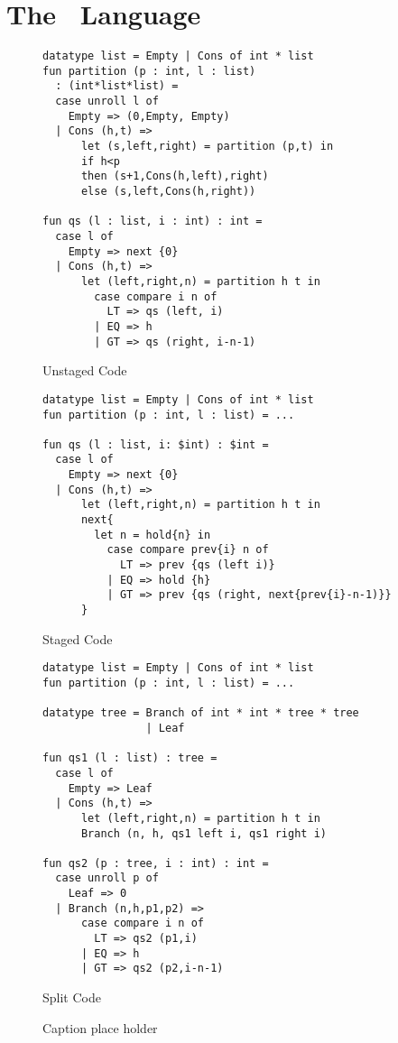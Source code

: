 \section {The \lang\ Language}

\begin{figure*}
\label{fig:quickselect}
\begin{minipage}{0.5\textwidth}
\begin{lstlisting} 
datatype list = Empty | Cons of int * list
fun partition (p : int, l : list) 
  : (int*list*list) =
  case unroll l of 
    Empty => (0,Empty, Empty) 
  | Cons (h,t) =>
      let (s,left,right) = partition (p,t) in
      if h<p 
      then (s+1,Cons(h,left),right)
      else (s,left,Cons(h,right))

fun qs (l : list, i : int) : int = 
  case l of
    Empty => next {0}
  | Cons (h,t) => 
      let (left,right,n) = partition h t in
        case compare i n of
          LT => qs (left, i)
        | EQ => h
        | GT => qs (right, i-n-1)
\end{lstlisting}
\caption{Unstaged Code}
\end{minipage}
\begin{minipage}{0.5\textwidth}
\begin{lstlisting} 
datatype list = Empty | Cons of int * list
fun partition (p : int, l : list) = ...

fun qs (l : list, i: $int) : $int = 
  case l of
    Empty => next {0}
  | Cons (h,t) => 
      let (left,right,n) = partition h t in
      next{
        let n = hold{n} in
          case compare prev{i} n of
            LT => prev {qs (left i)}
          | EQ => hold {h}
          | GT => prev {qs (right, next{prev{i}-n-1)}}
      }	
\end{lstlisting}
\caption{Staged Code}
\end{minipage}
\begin{minipage}{0.5\textwidth}
\begin{lstlisting} 
datatype list = Empty | Cons of int * list
fun partition (p : int, l : list) = ...
	
datatype tree = Branch of int * int * tree * tree
                | Leaf

fun qs1 (l : list) : tree =
  case l of
    Empty => Leaf
  | Cons (h,t) => 
      let (left,right,n) = partition h t in
      Branch (n, h, qs1 left i, qs1 right i)

fun qs2 (p : tree, i : int) : int = 
  case unroll p of
    Leaf => 0
  | Branch (n,h,p1,p2) => 
      case compare i n of
        LT => qs2 (p1,i)
      | EQ => h
      | GT => qs2 (p2,i-n-1)
\end{lstlisting}
\caption{Split Code}
\end{minipage}
\caption{Caption place holder}
\end{figure*}

